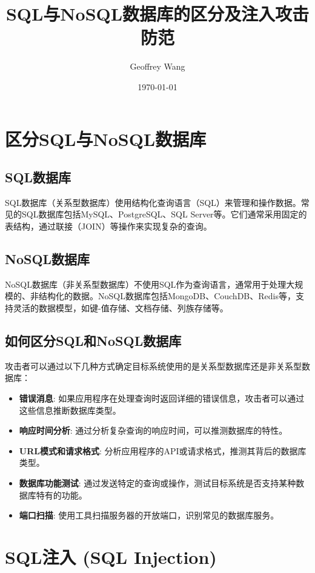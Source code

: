 \documentclass{article}
\title{SQL与NoSQL数据库的区分及注入攻击防范}
\author{Geoffrey Wang}
\date{\today}
\begin{document}
\maketitle

\section{区分SQL与NoSQL数据库}

\subsection{SQL数据库}
SQL数据库（关系型数据库）使用结构化查询语言（SQL）来管理和操作数据。常见的SQL数据库包括MySQL、PostgreSQL、SQL Server等。它们通常采用固定的表结构，通过联接（JOIN）等操作来实现复杂的查询。

\subsection{NoSQL数据库}
NoSQL数据库（非关系型数据库）不使用SQL作为查询语言，通常用于处理大规模的、非结构化的数据。NoSQL数据库包括MongoDB、CouchDB、Redis等，支持灵活的数据模型，如键-值存储、文档存储、列族存储等。

\subsection{如何区分SQL和NoSQL数据库}
攻击者可以通过以下几种方式确定目标系统使用的是关系型数据库还是非关系型数据库：
\begin{itemize}
    \item \textbf{错误消息}: 如果应用程序在处理查询时返回详细的错误信息，攻击者可以通过这些信息推断数据库类型。
    \item \textbf{响应时间分析}: 通过分析复杂查询的响应时间，可以推测数据库的特性。
    \item \textbf{URL模式和请求格式}: 分析应用程序的API或请求格式，推测其背后的数据库类型。
    \item \textbf{数据库功能测试}: 通过发送特定的查询或操作，测试目标系统是否支持某种数据库特有的功能。
    \item \textbf{端口扫描}: 使用工具扫描服务器的开放端口，识别常见的数据库服务。
\end{itemize}

\section{SQL注入 (SQL Injection)}
\end{document}

